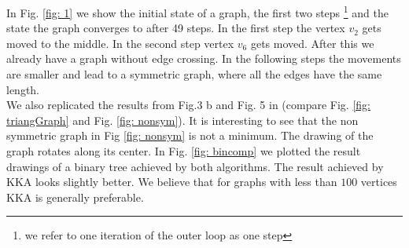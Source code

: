\documentclass[12pt,a4paper]{article}
\begin{document}
In Fig. \ref{fig: 1} we show the initial state of a graph, the first two steps \footnote{we refer to one iteration of the outer loop as one step}  and the state the graph converges to after 49 steps. In the first step the vertex $v_2$ gets moved to the middle. In the second step vertex $v_6$ gets moved. After this we already have a graph without edge crossing. In the following steps the movements are smaller and lead to a symmetric graph, where all the edges have the same length. \\
We also replicated the results from Fig.3 b and Fig. 5 in \cite{TomihisaKamada1989} (compare Fig. \ref{fig: triangGraph} and Fig. \ref{fig: nonsym}). It is interesting to see that the non symmetric graph in Fig \ref{fig: nonsym} is not a minimum. The drawing of the graph rotates along its center. 
In Fig. \ref{fig: bincomp} we plotted the result drawings of a binary tree achieved by both algorithms. The result achieved by KKA looks slightly better. We believe that for graphs with less than $100$ vertices KKA is generally preferable.

\FloatBarrier 
\end{document}
